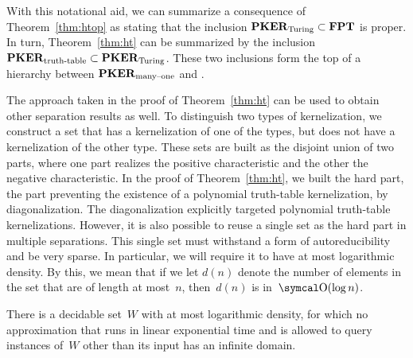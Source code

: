 With this notational aid, we can summarize a consequence of Theorem~\ref{thm:htop} as stating that the inclusion $\textnormal{\textbf{PKER}}_\textnormal{Turing} \subset \textnormal{\textbf{FPT}}$ is proper.
In turn, Theorem~\ref{thm:ht} can be summarized by the inclusion $\textnormal{\textbf{PKER}}_\textnormal{truth-table} \subset \textnormal{\textbf{PKER}}_\textnormal{Turing}$.
These two inclusions form the top of a hierarchy between $\textnormal{\textbf{PKER}}_\textnormal{many--one}$ and .

The approach taken in the proof of Theorem~\ref{thm:ht} can be used to obtain other separation results as well.
To distinguish two types of kernelization, we construct a set that has a kernelization of one of the types, but does not have a kernelization of the other type.
These sets are built as the disjoint union of two parts, where one part realizes the positive characteristic and the other the negative characteristic.
In the proof of Theorem~\ref{thm:ht}, we built the hard part, the part preventing the existence of a polynomial truth-table kernelization, by diagonalization.
The diagonalization explicitly targeted polynomial truth-table kernelizations.
However, it is also possible to reuse a single set as the hard part in multiple separations.
This single set must withstand a form of autoreducibility and be very sparse.
In particular, we will require it to have at most logarithmic density.
By this, we mean that if we let $d(n)$ denote the number of elements in the set that are of length at most~$n$, then~$d(n)$ is in~$\bigO(\log n)$.
\begin{lemma}
\label{lem:nonreducible}%
  There is a decidable set~$W$ with at most logarithmic density, for which no approximation that runs in linear exponential time and is allowed to query instances of~$W$ other than its input has an infinite domain.
\end{lemma}
